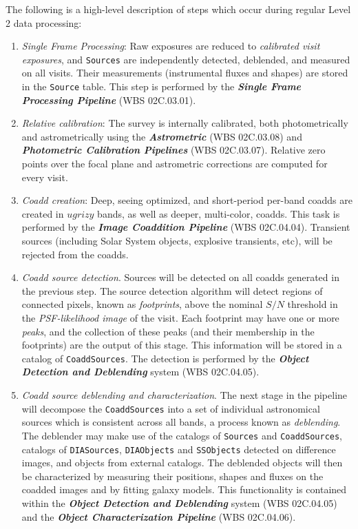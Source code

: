 \documentclass[12pt]{article}
\newcommand{\code}[1]{\texttt{#1}}
\newcommand{\DIASources}{\code{DIASources}\xspace}
\newcommand{\DIAObjects}{\code{DIAObjects}\xspace}
\newcommand{\Source}{\code{Source}\xspace}
\newcommand{\Sources}{\code{Sources}\xspace}
\newcommand{\CoaddSources}{\code{CoaddSources}\xspace}
\newcommand{\SSObjects}{\code{SSObjects}\xspace}
\newcommand{\wbsSFM}{WBS 02C.03.01}
\newcommand{\wbsCoadd}{WBS 02C.04.04}
\newcommand{\wbsDetDeblend}{WBS 02C.04.05}
\newcommand{\wbsObjChar}{WBS 02C.04.06}
\newcommand{\wbsPhotoCal}{WBS 02C.03.07}
\newcommand{\wbsAstroCal}{WBS 02C.03.08}
\begin{document}
The following is a high-level description of steps which occur during regular Level 2 data processing:
\begin{enumerate}
    \item \emph{Single Frame Processing}: Raw exposures are reduced to \emph{calibrated visit exposures}, and \Sources are independently detected, deblended, and measured on all visits. Their measurements (instrumental fluxes and shapes) are stored in the \Source table. This step is performed by the {\bf \emph{Single Frame Processing Pipeline}} (\wbsSFM).
    \item \emph{Relative calibration}: The survey is internally calibrated, both photometrically and astrometrically using the {\bf \emph{Astrometric}} (\wbsAstroCal) and {\bf \emph{Photometric Calibration Pipelines}} (\wbsPhotoCal). Relative zero points over the focal plane and astrometric corrections are computed for every visit.
    \item \emph{Coadd creation}: Deep, seeing optimized, and short-period per-band coadds are created in $ugrizy$ bands, as well as deeper, multi-color, coadds. This task is performed by the {\bf \emph{Image Coaddition Pipeline}} (\wbsCoadd). Transient sources (including Solar System objects, explosive transients, etc), will be rejected from the coadds.
    \item \emph{Coadd source detection}. Sources will be detected on all coadds generated in the previous step. The source detection algorithm will detect regions of connected pixels, known as \emph{footprints}, above the nominal $S/N$ threshold in the \emph{PSF-likelihood image} of the visit. Each footprint may have one or more \emph{peaks}, and the collection of these peaks (and their membership in the footprints) are the output of this stage. This information will be stored in a catalog of \CoaddSources. The detection is performed by the {\bf \emph{Object Detection and Deblending}} system (\wbsDetDeblend).
    \item \emph{Coadd source deblending and characterization}. The next stage in the pipeline will decompose the \CoaddSources into a set of individual astronomical sources which is consistent across all bands, a process known as \emph{deblending}. The deblender may make use of the catalogs of \Sources and \CoaddSources, catalogs of \DIASources, \DIAObjects and \SSObjects detected on difference images, and objects from external catalogs. The deblended objects will then be characterized by measuring their positions, shapes and fluxes on the coadded images and by fitting galaxy models. This functionality is contained within the {\bf \emph{Object Detection and Deblending}} system (\wbsDetDeblend) and the {\bf \emph{Object Characterization Pipeline}} (\wbsObjChar).

\end{enumerate}
\end{document}
